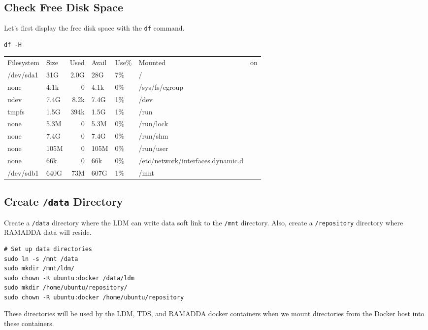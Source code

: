 \documentclass[11pt]{article}
\begin{document}
\subsection{Check Free Disk Space}
\label{sec:orgheadline28}

Let's first display the free disk space with the \texttt{df} command. 
\begin{verbatim}
df -H
\end{verbatim}

\begin{center}
\begin{tabular}{llrllll}
Filesystem & Size & Used & Avail & Use\% & Mounted & on\\
/dev/sda1 & 31G & 2.0G & 28G & 7\% & / & \\
none & 4.1k & 0 & 4.1k & 0\% & /sys/fs/cgroup & \\
udev & 7.4G & 8.2k & 7.4G & 1\% & /dev & \\
tmpfs & 1.5G & 394k & 1.5G & 1\% & /run & \\
none & 5.3M & 0 & 5.3M & 0\% & /run/lock & \\
none & 7.4G & 0 & 7.4G & 0\% & /run/shm & \\
none & 105M & 0 & 105M & 0\% & /run/user & \\
none & 66k & 0 & 66k & 0\% & /etc/network/interfaces.dynamic.d & \\
/dev/sdb1 & 640G & 73M & 607G & 1\% & /mnt & \\
\end{tabular}
\end{center}

\subsection{Create \texttt{/data} Directory}
\label{sec:orgheadline29}

Create a \texttt{/data} directory where the LDM can write data soft link to the \texttt{/mnt} directory. Also, create a \texttt{/repository} directory where RAMADDA data will reside.

\begin{verbatim}
# Set up data directories
sudo ln -s /mnt /data
sudo mkdir /mnt/ldm/
sudo chown -R ubuntu:docker /data/ldm
sudo mkdir /home/ubuntu/repository/
sudo chown -R ubuntu:docker /home/ubuntu/repository
\end{verbatim}

These directories will be used by the LDM, TDS, and RAMADDA docker containers when we mount directories from the Docker host into these containers.
\end{document}
